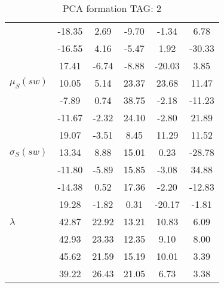 \begin{table}[h!]
\begin{center}
\begin{tabular}{| l || c | c | c | c | c |}
 & -18.35  & 2.69  & -9.70  & -1.34  & 6.78 \\
 & -16.55  & 4.16  & -5.47  & 1.92  & -30.33 \\
 & 17.41  & -6.74  & -8.88  & -20.03  & 3.85 \\\hline
$\mu_S(sw)$ & 10.05  & 5.14  & 23.37  & 23.68  & 11.47 \\
 & -7.89  & 0.74  & 38.75  & -2.18  & -11.23 \\
 & -11.67  & -2.32  & 24.10  & -2.80  & 21.89 \\
 & 19.07  & -3.51  & 8.45  & 11.29  & 11.52 \\\hline
$\sigma_S(sw)$ & 13.34  & 8.88  & 15.01  & 0.23  & -28.78 \\
 & -11.80  & -5.89  & 15.85  & -3.08  & 34.88 \\
 & -14.38  & 0.52  & 17.36  & -2.20  & -12.83 \\
 & 19.28  & -1.82  & 0.31  & -20.17  & -1.81 \\\hline\hline
$\lambda$ & 42.87  & 22.92  & 13.21  & 10.83  & 6.09 \\
 & 42.93  & 23.33  & 12.35  & 9.10  & 8.00 \\
 & 45.62  & 21.59  & 15.19  & 10.01  & 3.39 \\
 & 39.22  & 26.43  & 21.05  & 6.73  & 3.38 \\\hline
\end{tabular}
\caption{PCA formation TAG: 2}
\end{center}
\end{table}